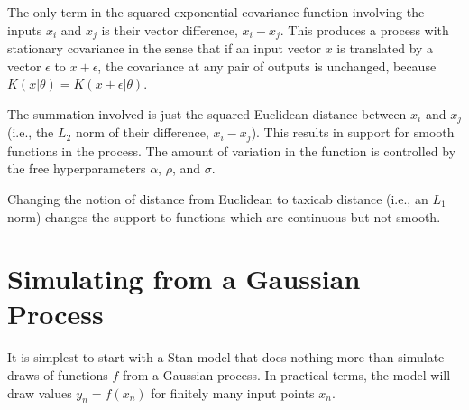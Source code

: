 The only term in the squared exponential covariance function involving
the inputs $x_i$ and $x_j$ is their vector difference, $x_i - x_j$.
This produces a process with stationary covariance in the sense that
if an input vector $x$ is translated by a vector $\epsilon$ to $x +
\epsilon$, the covariance at any pair of outputs is unchanged, because
$K(x | \theta) = K(x + \epsilon| \theta)$.

The summation involved is just the squared Euclidean distance between
$x_i$ and $x_j$ (i.e., the $L_2$ norm of their difference, $x_i -
x_j$). This results in support for smooth functions in the process.
The amount of variation in the function is controlled by the free
hyperparameters $\alpha$, $\rho$, and $\sigma$.

Changing the notion of distance from Euclidean to taxicab distance
(i.e., an $L_1$ norm) changes the support to functions which are
continuous but not smooth.

\section{Simulating from a Gaussian Process}

It is simplest to start with a Stan model that does nothing more than
simulate draws of functions $f$ from a Gaussian process.  In practical
terms, the model will draw values $y_n = f(x_n)$ for finitely many
input points $x_n$.


